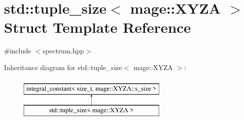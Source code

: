 \hypertarget{structstd_1_1tuple__size_3_01mage_1_1_x_y_z_a_01_4}{}\section{std\+:\+:tuple\+\_\+size$<$ mage\+:\+:X\+Y\+ZA $>$ Struct Template Reference}
\label{structstd_1_1tuple__size_3_01mage_1_1_x_y_z_a_01_4}


{\ttfamily \#include $<$spectrum.\+hpp$>$}

Inheritance diagram for std\+:\+:tuple\+\_\+size$<$ mage\+:\+:X\+Y\+ZA $>$\+:\begin{figure}[H]
\begin{center}
\leavevmode
\includegraphics[height=2.000000cm]{structstd_1_1tuple__size_3_01mage_1_1_x_y_z_a_01_4}
\end{center}
\end{figure}

